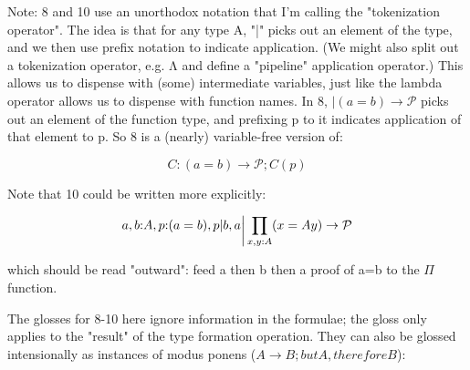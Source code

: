 \documentclass{article}
\begin{document}


Note: 8 and 10 use an unorthodox notation that I'm calling the
"tokenization operator".  The idea is that for any type A, "|" picks
out an element of the type, and we then use prefix notation to
indicate application. (We might also split out a tokenization
operator, e.g. Λ and define a "pipeline" application operator.)  This
allows us to dispense with (some) intermediate variables, just like
the lambda operator allows us to dispense with function names.  In
8, \(|(a=b)\to\mathcal{P}\) picks out an element of the function type,
and prefixing p to it indicates application of that element to p.  So
8 is a (nearly) variable-free version of:

    \[C:(a=b)\to\mathcal{P}; C(p)\]

Note that 10 could be written more explicitly:

\[a,b{:}A, p{:}(a=b), p\rvert b,a\raisebox{-4pt}{\(\biggr\rvert\)}\prod\limits_{x,y:A}(x=Ay)\to\mathcal{P}\]


which should be read "outward": feed a then b then a proof of a=b to the \(\Pi\) function.

The glosses for 8-10 here ignore information in the formulae; the gloss only applies to the "result" of the type formation operation.  They can also be glossed intensionally as instances of modus ponens
(\(A\to B; but A, therefore B\)):
\end{document}
